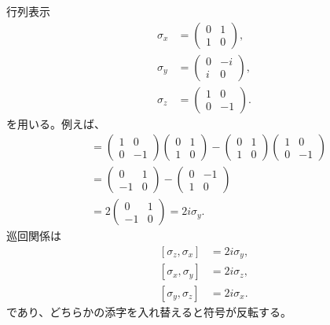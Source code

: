 行列表示
\begin{equation}
\begin{aligned}
\sigma_x&=
\begin{pmatrix}0&1\\1&0\end{pmatrix},\\[0.4em]
\sigma_y&=
\begin{pmatrix}0&-i\\i&0\end{pmatrix},\\[0.4em]
\sigma_z&=
\begin{pmatrix}1&0\\0&-1\end{pmatrix}.
\end{aligned}
\end{equation}
を用いる。例えば、
\begin{align}
[\sigma_z,\sigma_x]
&=
\begin{pmatrix}1&0\\0&-1\end{pmatrix}
\begin{pmatrix}0&1\\1&0\end{pmatrix}
-
\begin{pmatrix}0&1\\1&0\end{pmatrix}
\begin{pmatrix}1&0\\0&-1\end{pmatrix}\\
&=
\begin{pmatrix}0&1\\-1&0\end{pmatrix}
-
\begin{pmatrix}0&-1\\1&0\end{pmatrix}\\
&=2
\begin{pmatrix}0&1\\-1&0\end{pmatrix}
=2i\sigma_y.
\end{align}
巡回関係は
\begin{equation}
\begin{aligned}
[\sigma_z,\sigma_x]&=2i\sigma_y,\\
[\sigma_x,\sigma_y]&=2i\sigma_z,\\
[\sigma_y,\sigma_z]&=2i\sigma_x.
\end{aligned}
\label{eq:l5-pauli-commutators}
\end{equation}
であり、どちらかの添字を入れ替えると符号が反転する。

